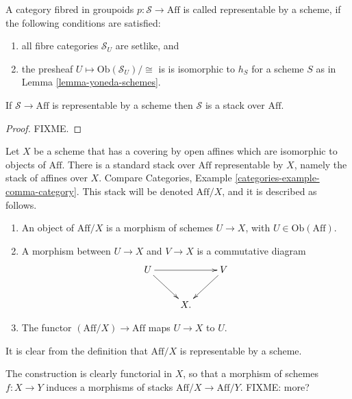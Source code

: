 \begin{definition}
\label{definition-representable-by-scheme}
A category fibred in groupoids $p : \mathcal{S} \to \text{Aff}$ is
called representable by a scheme, if the following conditions are satisfied:
\begin{enumerate}
\item all fibre categories $\mathcal{S}_U$ are setlike, and
\item the presheaf $U \mapsto \text{Ob}(\mathcal{S}_U)/\cong$ is 
is isomorphic to $h_S$ for a scheme $S$ as in
Lemma \ref{lemma-yoneda-schemes}.
\end{enumerate}
\end{definition}

\begin{lemma}
\label{lemma-representable-by-scheme-implies-stack}
If $\mathcal{S} \to \text{Aff}$ is representable by a scheme then $\mathcal{S}$
is a stack over $\text{Aff}$.
\end{lemma}

\begin{proof}
FIXME.
\end{proof}

\begin{example}
\label{example-standard-representable-scheme}
Let $X$ be a scheme that has a covering by open affines which are isomorphic
to objects of $\text{Aff}$. There is a standard stack over $\text{Aff}$
representable by $X$, namely the stack of affines over $X$. Compare
Categories, Example \ref {categories-example-comma-category}.
This stack will be denoted $\text{Aff}/X$, and it is described as follows.
\begin{enumerate}
\item An object of $\text{Aff}/X$ is a morphism of schemes
$U \to X$, with $U \in \text{Ob}(\text{Aff})$.
\item A morphism between $U\to X$ and $V \to X$ is a commutative diagram
$$
\xymatrix{
U \ar[rr] \ar[rd] && V \ar[ld] \\
&X.&}
$$
\item The functor $(\text{Aff}/X) \to \text{Aff}$ maps $U\to X$ to $U$.
\end{enumerate}
It is clear from the definition that $\text{Aff}/X$ is representable by
a scheme. 

\smallskip\noindent
The construction is clearly functorial in $X$, so that a morphism
of schemes $f : X \to Y$ induces a morphisms of stacks 
$\text{Aff}/X \to \text{Aff}/Y$. FIXME: more?
\end{example}

